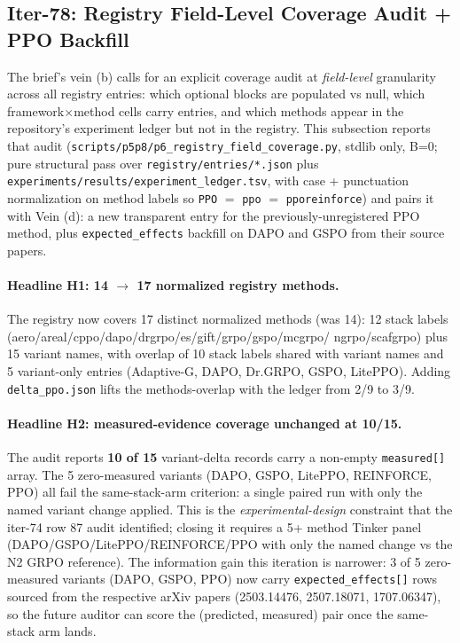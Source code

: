 \documentclass{article}
\begin{document}
 \subsection{Iter-78: Registry Field-Level Coverage Audit + PPO Backfill}
\label{sec:p6-iter78-field-coverage}

The brief's vein (b) calls for an explicit coverage audit at
\emph{field-level} granularity across all registry entries: which optional
blocks are populated vs null, which framework$\times$method cells carry
entries, and which methods appear in the repository's experiment ledger
but not in the registry. This subsection reports that audit
(\texttt{scripts/p5p8/p6\_registry\_field\_coverage.py}, stdlib only,
B=0; pure structural pass over \texttt{registry/entries/*.json} plus
\texttt{experiments/results/experiment\_ledger.tsv}, with case +
punctuation normalization on method labels so \texttt{PPO} $=$
\texttt{ppo} $=$ \texttt{pporeinforce}) and pairs it with Vein (d): a
new transparent entry for the previously-unregistered PPO method, plus
\texttt{expected\_effects} backfill on DAPO and GSPO from their
source papers.

\paragraph{Headline H1: 14 $\rightarrow$ 17 normalized registry methods.}
The registry now covers 17 distinct normalized methods (was 14):
12 stack labels (aero/areal/cppo/dapo/drgrpo/es/gift/grpo/gspo/mcgrpo/
ngrpo/scafgrpo) plus 15 variant names, with overlap of 10 stack labels
shared with variant names and 5 variant-only entries (Adaptive-G,
DAPO, Dr.GRPO, GSPO, LitePPO). Adding \texttt{delta\_ppo.json} lifts
the methods-overlap with the ledger from 2/9 to 3/9.

\paragraph{Headline H2: measured-evidence coverage unchanged at 10/15.}
The audit reports \textbf{10 of 15} variant-delta records carry a
non-empty \texttt{measured[]} array. The 5 zero-measured variants
(DAPO, GSPO, LitePPO, REINFORCE, PPO) all fail the same-stack-arm
criterion: a single paired run with only the named variant change
applied. This is the \emph{experimental-design} constraint that the
iter-74 row 87 audit identified; closing it requires a 5+ method
Tinker panel (DAPO/GSPO/LitePPO/REINFORCE/PPO with only the named
change vs the N2 GRPO reference). The information gain this iteration is
narrower: 3 of 5 zero-measured variants (DAPO, GSPO, PPO) now carry
\texttt{expected\_effects[]} rows sourced from the respective arXiv
papers (2503.14476, 2507.18071, 1707.06347), so the future auditor
can score the (predicted, measured) pair once the same-stack arm
lands.
\end{document}
